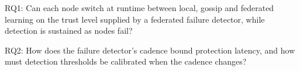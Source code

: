 
RQ1: Can each node switch at runtime between local, gossip and federated learning on the
trust level supplied by a federated failure detector, while detection is sustained as
nodes fail?

RQ2: How does the failure detector's cadence bound protection latency, and how must
detection thresholds be calibrated when the cadence changes?



